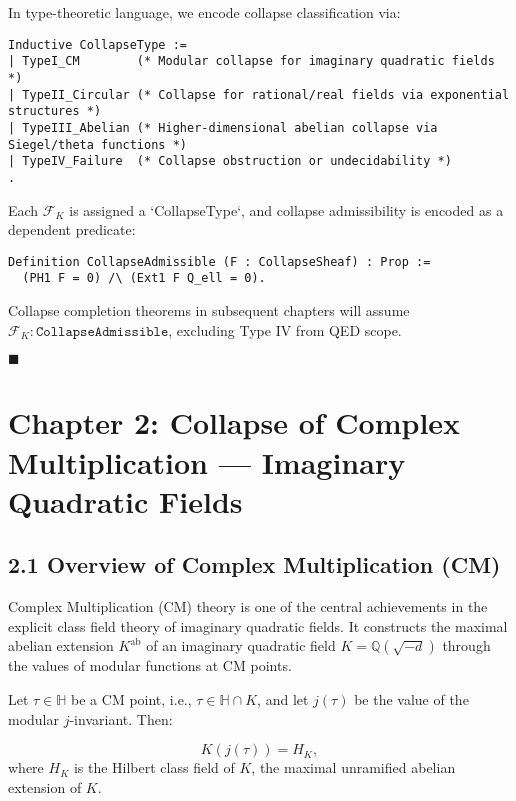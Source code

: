\documentclass[11pt]{article}
\begin{document}
In type-theoretic language, we encode collapse classification via:

\begin{lstlisting}[language=Coq, caption={Collapse Typing in Coq}]
Inductive CollapseType :=
| TypeI_CM        (* Modular collapse for imaginary quadratic fields *)
| TypeII_Circular (* Collapse for rational/real fields via exponential structures *)
| TypeIII_Abelian (* Higher-dimensional abelian collapse via Siegel/theta functions *)
| TypeIV_Failure  (* Collapse obstruction or undecidability *)
.
\end{lstlisting}

Each \( \mathcal{F}_K \) is assigned a `CollapseType`, and collapse admissibility is encoded as a dependent predicate:
\begin{lstlisting}[language=Coq, caption={Collapse Admissibility Predicate}]
Definition CollapseAdmissible (F : CollapseSheaf) : Prop :=
  (PH1 F = 0) /\ (Ext1 F Q_ell = 0).
\end{lstlisting}

Collapse completion theorems in subsequent chapters will assume \( \mathcal{F}_K : \texttt{CollapseAdmissible} \), excluding Type IV from QED scope.

\hfill $\blacksquare$




\section{Chapter 2: Collapse of Complex Multiplication — Imaginary Quadratic Fields}

\subsection{2.1 Overview of Complex Multiplication (CM)}

Complex Multiplication (CM) theory is one of the central achievements in the explicit class field theory of imaginary quadratic fields. It constructs the maximal abelian extension \( K^{\mathrm{ab}} \) of an imaginary quadratic field \( K = \mathbb{Q}(\sqrt{-d}) \) through the values of modular functions at CM points.

Let \( \tau \in \mathbb{H} \) be a CM point, i.e., \( \tau \in \mathbb{H} \cap K \), and let \( j(\tau) \) be the value of the modular \( j \)-invariant. Then:

\[
K(j(\tau)) = H_K,
\]
where \( H_K \) is the Hilbert class field of \( K \), the maximal unramified abelian extension of \( K \).
\end{document}
